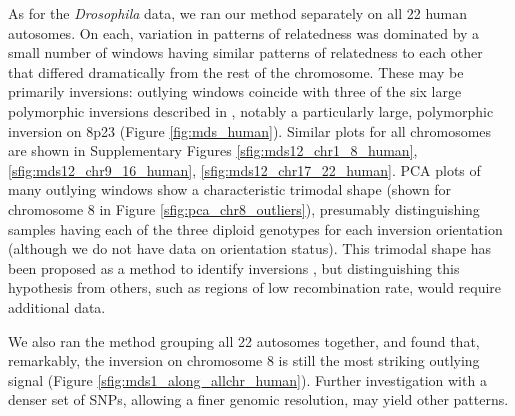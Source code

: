 \documentclass[11pt, oneside]{article}   	%
\begin{document}
As for the \textit{Drosophila} data, we ran our method separately on all 22 human autosomes.
On each, variation in patterns of relatedness was dominated by a small number of windows
having similar patterns of relatedness to each other that differed dramatically from the rest of the chromosome.
These may be primarily inversions: outlying windows coincide with
three of the six large polymorphic inversions described in \citet{antonacci2009characterization},
notably a particularly large, polymorphic inversion on 8p23 (Figure \ref{fig:mds_human}). 
Similar plots for all chromosomes are shown
in Supplementary Figures \ref{sfig:mds12_chr1_8_human}, \ref{sfig:mds12_chr9_16_human}, \ref{sfig:mds12_chr17_22_human}.
PCA plots of many outlying windows show a characteristic trimodal shape 
(shown for chromosome 8 in Figure \ref{sfig:pca_chr8_outliers}),
presumably distinguishing samples having each of the three diploid genotypes for each inversion orientation
(although we do not have data on orientation status).
This trimodal shape has been proposed as a method to identify inversions \citep{ma2012investigation},
but distinguishing this hypothesis from others,
such as regions of low recombination rate,
would require additional data.

We also ran the method grouping all 22 autosomes together, 
and found that, remarkably, 
the inversion on chromosome 8 is still the most striking outlying signal (Figure \ref{sfig:mds1_along_allchr_human}). 
Further investigation with a denser set of SNPs,
allowing a finer genomic resolution,
may yield other patterns.
\end{document}

